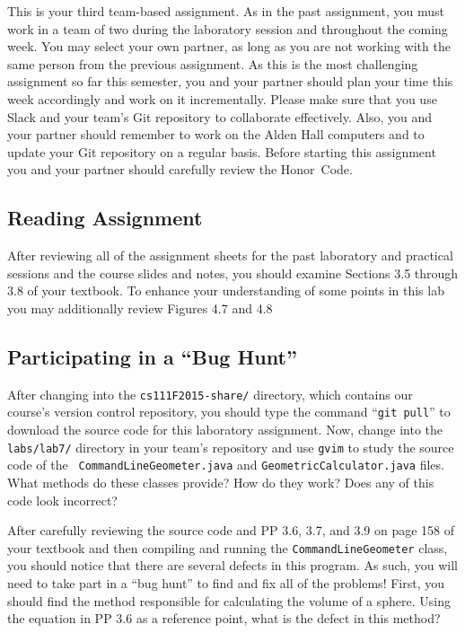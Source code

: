 This is your third team-based assignment. As in the past assignment, you must work in a team of two during the
laboratory session and throughout the coming week. You may select your own partner, as long as you are not working with
the same person from the previous assignment.  As this is the most challenging assignment so far this semester, you and
your partner should plan your time this week accordingly and work on it incrementally. Please make sure that you use
Slack and your team's Git repository to collaborate effectively.  Also, you and your partner should remember to
work on the Alden Hall computers and to update your Git repository on a regular basis. Before starting this assignment
you and your partner should carefully review the \mbox{Honor Code}.

\vspace*{-.1in}
\subsection*{Reading Assignment}

After reviewing all of the assignment sheets for the past laboratory and practical sessions and the course slides and
notes, you should examine Sections 3.5 through 3.8 of your textbook. To enhance your understanding of some points in
this lab you may additionally review Figures 4.7 and 4.8

\vspace*{-.1in}
\subsection*{Participating in a ``Bug Hunt''}

After changing into the {\tt cs111F2015-share/} directory, which contains our course's version control repository, you
should type the command ``{\tt git pull}'' to download the source code for this laboratory assignment. Now, change into
the {\tt labs/lab7/} directory in your team's repository and use {\tt gvim} to study the source code of the {\tt
  CommandLineGeometer.java} and {\tt GeometricCalculator.java} files. What methods do these classes provide? How do they
  work? Does any of this code look incorrect?

After carefully reviewing the source code and PP 3.6, 3.7, and 3.9 on page 158 of your textbook and then compiling and
running the {\tt CommandLineGeometer} class, you should notice that there are several defects in this program. As
such, you will need to take part in a ``bug hunt'' to find and fix all of the problems! First, you should find the
method responsible for calculating the volume of a sphere. Using the equation in PP 3.6 as a reference point, what is
the defect in this method?

